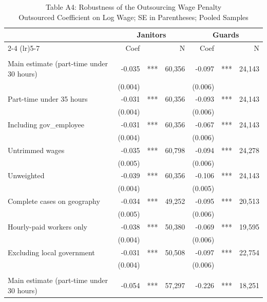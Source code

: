 \begin{table}[!t]
\caption*{
{\large Table A4: Robustness of the Outsourcing Wage Penalty} \\
{\small Outsourced Coefficient on Log Wage; SE in Parentheses; Pooled Samples}
} 

\fontsize{10.0pt}{12.0pt}\selectfont

\begin{tabular*}{\linewidth}{@{\extracolsep{\fill}}l|rlrrlr}
\toprule
  & \multicolumn{3}{c}{Janitors} & \multicolumn{3}{c}{Guards} \\ 
\cmidrule(lr){2-4} \cmidrule(lr){5-7}
  & Coef &  & N & Coef &  & N \\ 
\midrule\addlinespace[2.5pt]
\multicolumn{7}{l}{2001-2025} \\[2.5pt] 
\midrule\addlinespace[2.5pt]
Main estimate (part-time under 30 hours) & -0.035 & *** & 60,356 & -0.097 & *** & 24,143 \\
 & (0.004) &  &  & (0.006) &  &  \\
Part-time under 35 hours & -0.031 & *** & 60,356 & -0.093 & *** & 24,143 \\
 & (0.004) &  &  & (0.006) &  &  \\
Including gov\_employee & -0.031 & *** & 60,356 & -0.067 & *** & 24,143 \\
 & (0.004) &  &  & (0.006) &  &  \\
Untrimmed wages & -0.035 & *** & 60,798 & -0.094 & *** & 24,278 \\
 & (0.005) &  &  & (0.006) &  &  \\
Unweighted & -0.039 & *** & 60,356 & -0.106 & *** & 24,143 \\
 & (0.004) &  &  & (0.005) &  &  \\
Complete cases on geography & -0.034 & *** & 49,252 & -0.095 & *** & 20,513 \\
 & (0.005) &  &  & (0.006) &  &  \\
Hourly-paid workers only & -0.038 & *** & 50,380 & -0.069 & *** & 19,595 \\
 & (0.004) &  &  & (0.006) &  &  \\
Excluding local government & -0.031 & *** & 50,508 & -0.097 & *** & 22,754 \\
 & (0.004) &  &  & (0.006) &  &  \\
\midrule\addlinespace[2.5pt]
\multicolumn{7}{l}{1983-2000} \\[2.5pt] 
\midrule\addlinespace[2.5pt]
Main estimate (part-time under 30 hours) & -0.054 & *** & 57,297 & -0.226 & *** & 18,251 \\

\end{tabular*}
\end{table}
